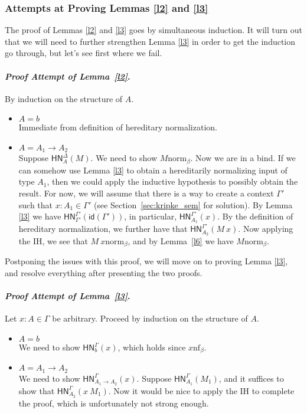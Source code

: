 \documentclass{article}
\newenvironment{prfattemptref}[1]{\paragraph{\emph{Proof Attempt of #1}.}}{\hfill\color{red}{X}\par}
\newcommand{\bnf}[1]{#1 \mathrel{\text{nf}_\beta}}
\newcommand{\bnorm}[1]{\ensuremath{#1 \mathrel{\text{norm}_\beta}}}
\newcommand{\hnorm}[3]{\ensuremath{\mathsf{HN}^{#1}_{#2}(#3)}}
\newcommand{\id}[1]{\ensuremath{\mathsf{id}(#1)}}
\newcommand{\fn}[2]{\ensuremath{#1 \to #2}}
\newcommand{\ap}[2]{\ensuremath{#1\ #2}}
\begin{document}
\subsubsection{Attempts at Proving Lemmas \ref{l2} and \ref{l3}}

The proof of Lemmas \ref{l2} and \ref{l3} goes by simultaneous induction.  It will turn out that
we will need to further strengthen Lemma \ref{l3} in order to get the induction go through, but
let's see first where we fail.

\begin{prfattemptref}{Lemma~\ref{l2}}
By induction on the structure of $A$.
\begin{itemize}
  \setlength\itemsep{1em}
  \item $A = b$\\
  Immediate from definition of hereditary normalization.
\item $A = \fn{A_1}{A_2}$\\
  Suppose $\hnorm{\Delta}{A}{M}$. We need to show $\bnorm{M}$. Now we are in a bind. If we can
  somehow use Lemma \ref{l3} to obtain a hereditarily normalizing input of type $A_1$, then we
  could apply the inductive hypothesis to possibly obtain the result. For now, we will
  assume that there is a way to create a context $\Gamma'$ such that $x : A_1 \in \Gamma'$ (see
  Section~\ref{sec:kripke_sem} for solution).  By Lemma \ref{l3} we have
  $\hnorm{\Gamma'}{\Gamma'}{\id{\Gamma'}}$, in particular, $\hnorm{\Gamma'}{A_1}{x}$. By the
  definition of hereditary normalization, we further have that
  $\hnorm{\Gamma'}{A_2}{\ap{M}{x}}$. Now applying the IH, we see that $\bnorm{\ap{M}{x}}$, and
  by Lemma~\ref{l6} we have $\bnorm{M}$.  \qedhere
\end{itemize}
\end{prfattemptref}

Postponing the issues with this proof, we will move on to proving Lemma \ref{l3}, and resolve everything after
presenting the two proofs.

\begin{prfattemptref}{Lemma~\ref{l3}}
Let $x : A \in \Gamma$ be arbitrary. Proceed by induction on the structure of $A$.
\begin{itemize}
  \setlength\itemsep{1em}
  \item $A = b$\\
  We need to show $\hnorm{\Gamma}{b}{x}$, which holds since $\bnf{x}$.
  \item $A = \fn{A_1}{A_2}$\\
  We need to show $\hnorm{\Gamma}{\fn{A_1}{A_2}}{x}$. Suppose $\hnorm{\Gamma}{A_1}{M_1}$, and it suffices to show
  that $\hnorm{\Gamma}{A_2}{\ap{x}{M_1}}$. Now it would be nice to apply the IH to complete the proof, which
  is unfortunately not strong enough.
\end{itemize}
\end{prfattemptref}
\end{document}
